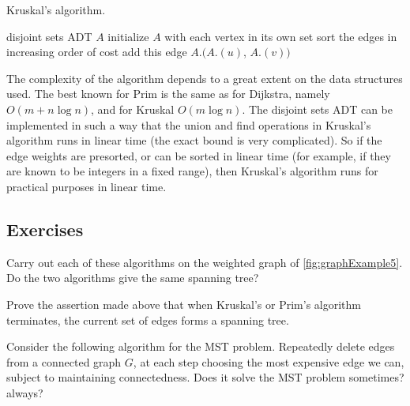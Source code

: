 \begin{algorithm}[H]
  \caption{Kruskal's algorithm.}
  \label{alg:kruskal}
\begin{algorithmic}[1]
	\State disjoint sets ADT $A$
	\State initialize $A$ with each vertex in its own set
	\State sort the edges in increasing order of cost
			\State add this edge
			\State $A$.$(A$.$(u)$, $A$.$(v))$
		\EndIf
	\EndFor
	\State {}
\EndFunction
\end{algorithmic}
\end{algorithm}

The complexity of the algorithm depends to a great extent on the data
structures used. The best known for Prim is the same as for Dijkstra,
namely $O(m + n\log n)$, and for Kruskal $O(m \log n)$. The disjoint sets
ADT can be implemented in such a way that the union and find operations
in Kruskal's algorithm runs in  linear time (the exact bound
is very complicated). So if the edge weights are presorted, or can be
sorted in linear time (for example, if they are known to be integers in
a fixed range), then Kruskal's algorithm runs for practical purposes in
linear time.

\subsection*{Exercises}

\begin{Exercise} \label{ex:doMST}
Carry out each of these algorithms on the weighted
graph of \cref{fig:graphExample5}. Do the two algorithms give the
same spanning tree? 
\end{Exercise}

\begin{Exercise} \label{ex:spanning-tree}
Prove the assertion made above that when Kruskal's or Prim's algorithm 
terminates, the current set of edges forms a spanning tree.
\end{Exercise}

\begin{Exercise}\label{ex:silly-MST}
Consider the following algorithm for the MST problem. Repeatedly delete
edges from a connected graph $G$, at each step choosing the most
expensive edge we can, subject to maintaining connectedness. Does it
solve the MST problem sometimes? always?
\end{Exercise}

